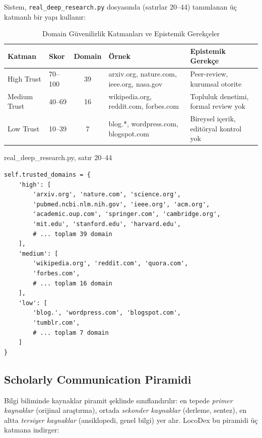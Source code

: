 Sistem, \texttt{real\_deep\_research.py} dosyas{\i}nda (sat{\i}rlar 20--44) tan{\i}mlanan \"{u}\c{c} katmanl{\i} bir yap{\i} kullan{\i}r:

\begin{table}[H]
\centering
\caption{Domain G\"{u}venilirlik Katmanlar{\i} ve Epistemik Gerek\c{c}eler}
\label{tab:domain-trust}
\begin{tabularx}{\textwidth}{llcXX}
\toprule
\color{chapterBlue}\textbf{Katman} & \color{chapterBlue}\textbf{Skor} & \color{chapterBlue}\textbf{Domain} & \color{chapterBlue}\textbf{\"{O}rnek} & \color{chapterBlue}\textbf{Epistemik Gerek\c{c}e} \\
\midrule
High Trust   & 70--100 & 39 & arxiv.org, nature.com, ieee.org, nasa.gov   & Peer-review, kurumsal otorite \\
Medium Trust & 40--69  & 16 & wikipedia.org, reddit.com, forbes.com       & Topluluk denetimi, formal review yok \\
Low Trust    & 10--39  & 7  & blog.*, wordpress.com, blogspot.com          & Bireysel i\c{c}erik, edit\"{o}ryal kontrol yok \\
\bottomrule
\end{tabularx}
\end{table}

\begin{kodref}{real\_deep\_research.py, sat{\i}r 20--44}
\begin{lstlisting}
self.trusted_domains = {
    'high': [
        'arxiv.org', 'nature.com', 'science.org',
        'pubmed.ncbi.nlm.nih.gov', 'ieee.org', 'acm.org',
        'academic.oup.com', 'springer.com', 'cambridge.org',
        'mit.edu', 'stanford.edu', 'harvard.edu',
        # ... toplam 39 domain
    ],
    'medium': [
        'wikipedia.org', 'reddit.com', 'quora.com',
        'forbes.com',
        # ... toplam 16 domain
    ],
    'low': [
        'blog.', 'wordpress.com', 'blogspot.com',
        'tumblr.com',
        # ... toplam 7 domain
    ]
}
\end{lstlisting}
\end{kodref}

\subsection{Scholarly Communication Piramidi}

Bilgi biliminde kaynaklar piramit \c{s}eklinde s{\i}n{\i}fland{\i}r{\i}l{\i}r: en tepede \emph{primer kaynaklar} (orijinal ara\c{s}t{\i}rma), ortada \emph{sekonder kaynaklar} (derleme, sentez), en altta \emph{tersiyer kaynaklar} (ansiklopedi, genel bilgi) yer al{\i}r. LocoDex bu piramidi \"{u}\c{c} katmana indirger:

